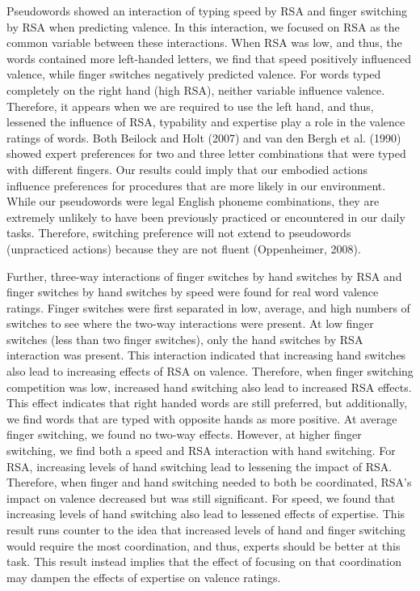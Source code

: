 \documentclass[english,man]{apa6}
\theoremstyle{definition}
\theoremstyle{definition}
\theoremstyle{definition}
\theoremstyle{remark}
\begin{document}
Pseudowords showed an interaction of typing speed by RSA and finger
switching by RSA when predicting valence. In this interaction, we
focused on RSA as the common variable between these interactions. When
RSA was low, and thus, the words contained more left-handed letters, we
find that speed positively influenced valence, while finger switches
negatively predicted valence. For words typed completely on the right
hand (high RSA), neither variable influence valence. Therefore, it
appears when we are required to use the left hand, and thus, lessened
the influence of RSA, typability and expertise play a role in the
valence ratings of words. Both Beilock and Holt (2007) and van den Bergh
et al. (1990) showed expert preferences for two and three letter
combinations that were typed with different fingers. Our results could
imply that our embodied actions influence preferences for procedures
that are more likely in our environment. While our pseudowords were
legal English phoneme combinations, they are extremely unlikely to have
been previously practiced or encountered in our daily tasks. Therefore,
switching preference will not extend to pseudowords (unpracticed
actions) because they are not fluent (Oppenheimer, 2008).

Further, three-way interactions of finger switches by hand switches by
RSA and finger switches by hand switches by speed were found for real
word valence ratings. Finger switches were first separated in low,
average, and high numbers of switches to see where the two-way
interactions were present. At low finger switches (less than two finger
switches), only the hand switches by RSA interaction was present. This
interaction indicated that increasing hand switches also lead to
increasing effects of RSA on valence. Therefore, when finger switching
competition was low, increased hand switching also lead to increased RSA
effects. This effect indicates that right handed words are still
preferred, but additionally, we find words that are typed with opposite
hands as more positive. At average finger switching, we found no two-way
effects. However, at higher finger switching, we find both a speed and
RSA interaction with hand switching. For RSA, increasing levels of hand
switching lead to lessening the impact of RSA. Therefore, when finger
and hand switching needed to both be coordinated, RSA's impact on
valence decreased but was still significant. For speed, we found that
increasing levels of hand switching also lead to lessened effects of
expertise. This result runs counter to the idea that increased levels of
hand and finger switching would require the most coordination, and thus,
experts should be better at this task. This result instead implies that
the effect of focusing on that coordination may dampen the effects of
expertise on valence ratings.
\end{document}
